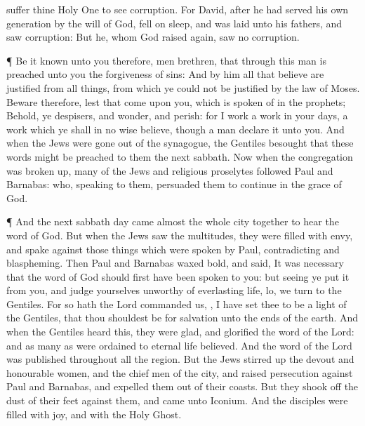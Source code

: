 {suffer
thine Holy
One to
see
corruption.
For
David, after he had
served his
own
generation by the
will of
God, fell on
sleep,
and was
laid
unto
his
fathers,
and
saw
corruption:
But he,
whom
God raised
again,
saw
no
corruption.
\par }{\PP {}¶ Be
it
known unto
you
therefore,
men
{}
brethren,
that
through this
man is
preached unto
you the
forgiveness of
sins:
And
by
him
all that
believe are
justified
from all
things, from
which ye
could
not be
justified
by the
law of
Moses.
Beware
therefore,
lest that
come
upon
you, which is spoken
of
in the
prophets;
Behold, ye
despisers,
and
wonder,
and
perish:
for
I
work a
work
in
your
days, a
work
which ye
shall in no
wise
believe,
though a
man declare
it unto
you.
And
when the
Jews were
gone out
of the
synagogue, the
Gentiles
besought that
these
words might be
preached to
them the
next
sabbath.
Now
when the
congregation was broken
up,
many of the
Jews
and
religious
proselytes
followed
Paul
and
Barnabas:
who,
speaking to
them,
persuaded
them to continue
in the
grace of
God.
\par }{\PP {}¶
And the
next sabbath
day
came
almost the
whole
city
together to
hear the
word of
God.
But
when the
Jews
saw the
multitudes, they were
filled with
envy,
and spake
against those things which were
spoken
by
Paul,
contradicting
and
blaspheming.
Then
Paul
and
Barnabas waxed
bold, and
said, It
was
necessary that the
word of
God
should
first have been
spoken to
you:
but
seeing ye
put
it from
you,
and
judge
yourselves
unworthy of
everlasting
life,
lo, we
turn
to the
Gentiles.
For
so
hath the
Lord
commanded
us,
{}, I have
set
thee to
be a
light of the
Gentiles, that
thou shouldest
be
for
salvation
unto the
ends of the
earth.
And
when the
Gentiles heard
this, they were
glad,
and
glorified the
word of the
Lord:
and as many
as
were
ordained
to
eternal
life
believed.
And the
word of the
Lord was
published
throughout
all the
region.
But the
Jews stirred
up the
devout
and
honourable
women,
and the chief
men of the
city,
and
raised
persecution
against
Paul
and
Barnabas,
and
expelled
them out
of
their
coasts.
But they shook
off the
dust of
their
feet
against
them, and
came
unto
Iconium.
And the
disciples were
filled with
joy,
and with the
Holy
Ghost.

}
